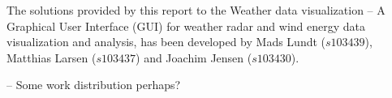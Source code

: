 The solutions provided by this report to the Weather data visualization -- A Graphical User Interface (GUI) for weather radar and wind energy data visualization and analysis, has been developed by Mads Lundt ($s103439$), Matthias Larsen ($s103437$) and Joachim Jensen ($s103430$).

-- Some work distribution perhaps?